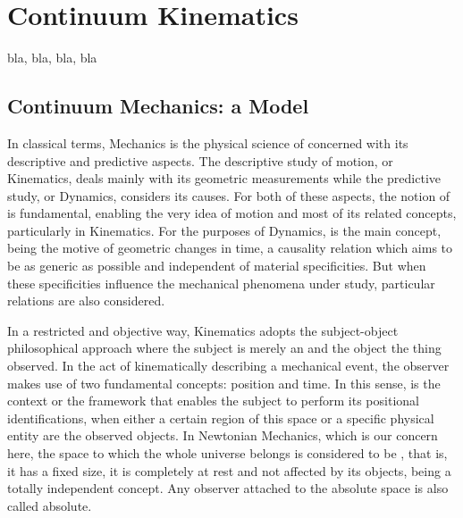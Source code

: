 \chapter{Continuum Kinematics}

bla, bla, bla, bla


\section{Continuum Mechanics: a Model}

In classical terms, Mechanics is the physical science of  concerned with its descriptive and predictive aspects. The descriptive study of motion, or Kinematics, deals mainly with its geometric measurements while the predictive study, or Dynamics, considers its causes. For both of these aspects, the notion of  is fundamental, enabling the very idea of motion and most of its related concepts, particularly in Kinematics. For the purposes of Dynamics,  is the main concept, being the motive of geometric changes in time, a causality relation which aims to be as generic as possible and independent of material specificities. But when these specificities influence the mechanical phenomena under study, particular relations are also considered. 


In a restricted and objective way, Kinematics adopts the subject-object philosophical approach where the subject is merely an  and the object the thing observed. In the act of kinematically describing a mechanical event, the observer makes use of two fundamental concepts: position and time. In this sense,  is the context or the framework that enables the subject to perform its positional identifications, when either a certain region of this space or a specific physical entity are the observed objects. In Newtonian Mechanics, which is our concern here, the space to which the whole universe belongs is considered to be , that is, it has a fixed size, it is completely at rest and not affected by its objects, being a totally independent concept. Any observer attached to the absolute space is also called absolute. 

